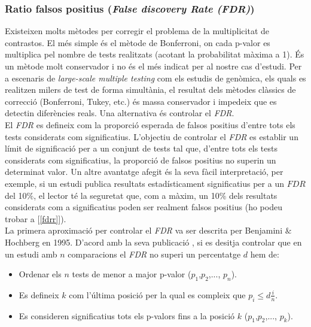 \documentclass[english]{article}
\begin{document}
\subsubsection{Ratio falsos positius (\emph{False discovery Rate (FDR)})}
\label{2.2.1}
Existeixen molts mètodes per corregir el problema de la multiplicitat de contrastos. El més simple és el mètode de Bonferroni, on cada p-valor es multiplica pel nombre de tests realitzats (acotant la probabilitat màxima a 1). És un mètode molt conservador i no és el més indicat per al nostre cas d'estudi.
Per a escenaris de \textit{large-scale multiple testing} com els estudis de genòmica, els quals es realitzen milers de test de forma simultània, el resultat dels mètodes clàssics de correcció (Bonferroni, Tukey, etc.) és massa conservador i impedeix que es detectin diferències reals. Una alternativa és controlar el \emph{FDR}.
\\

El  \emph{FDR} es defineix com la proporció esperada de falsos positius d'entre tots els tests considerats com significatius. L'objectiu de controlar el \emph{FDR} es establir un límit de significació per a un conjunt de tests tal que, d'entre tots els tests considerats com significatius, la proporció de falsos positius no superin un determinat valor.
Un altre avantatge afegit és la seva fàcil interpretació, per exemple, si un estudi publica resultats estadísticament significatius per a un $FDR$ del 10$\%$, el lector té la seguretat que, com a màxim, un 10$\%$ dels resultats considerats com a significatius poden ser realment falsos positius (ho podeu trobar a [\ref{fdrr}]).
\\
La primera aproximació per controlar el \emph{FDR} va ser descrita per Benjamini $\&$ Hochberg en 1995. D'acord amb la seva publicació \cite{fdr}, si es desitja controlar que en un estudi amb $n$ comparacions el \emph{FDR} no superi un percentatge $d$ hem de:

\begin{itemize}
\item Ordenar els $n$ tests de menor a major p-valor ($p_{1}$,$p_{2}$,..., $p_n$).
\item Es defineix $k$ com l'última posició per la qual es compleix que $p_i \leq d\frac{i}{n}$.
\item Es consideren significatius tots els p-valors fins a la posició $k$ ($p_{1}$,$p_{2}$,..., $p_k$).

\end{itemize}
\end{document}
